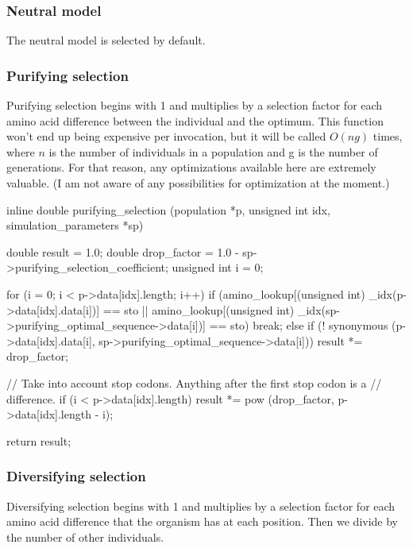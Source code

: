 \documentclass{article}
\begin{document}
      \subsubsection{Neutral model}

	The neutral model is selected by default.

      \subsubsection{Purifying selection}

	Purifying selection begins with 1 and multiplies by a selection factor
	for each amino acid difference between the individual and the optimum.
	This function won't end up being expensive per invocation, but it will
	be called $O(ng)$ times, where $n$ is the number of individuals in a
	population and g is the number of generations. For that reason, any
	optimizations available here are extremely valuable. (I am not aware of
	    any possibilities for optimization at the moment.)

\begin{ccode}
inline double purifying_selection (population *p, unsigned int idx, simulation_parameters *sp) {
  double	result          = 1.0;
  double	drop_factor     = 1.0 - sp->purifying_selection_coefficient;
  unsigned int	i            	= 0;

  for (i = 0; i < p->data[idx].length; i++)
    if (amino_lookup[(unsigned int) _idx(p->data[idx].data[i])] == sto ||
	amino_lookup[(unsigned int) _idx(sp->purifying_optimal_sequence->data[i])] == sto)
      break;
    else if (! synonymous (p->data[idx].data[i], sp->purifying_optimal_sequence->data[i]))
      result *= drop_factor;

  // Take into account stop codons. Anything after the first stop codon is a
  // difference.
  if (i < p->data[idx].length)
    result *= pow (drop_factor, p->data[idx].length - i);

  return result;
}
\end{ccode}

      \subsubsection{Diversifying selection}

	Diversifying selection begins with 1 and multiplies by a selection
	factor for each amino acid difference that the organism has at each
	position. Then we divide by the number of other individuals.
\end{document}

